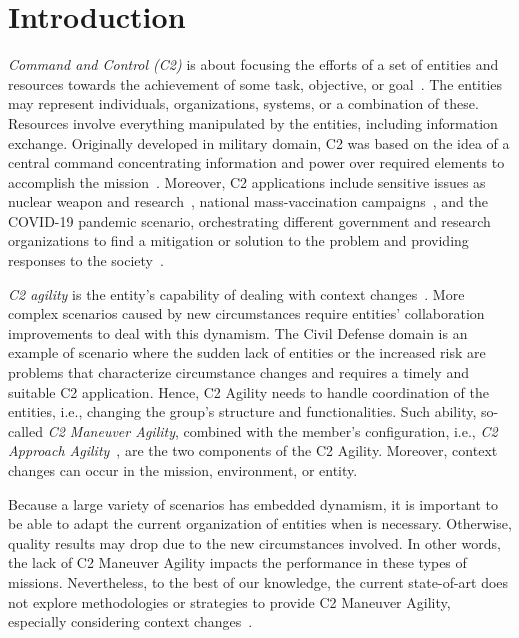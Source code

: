 \section{Introduction}
\label{sec:introduction}


\textit{Command and Control (C2)} is about focusing the efforts of a set of entities and resources towards the achievement of some task, objective, or goal~\citep{CC02}. The entities may represent individuals, organizations, systems, or a combination of these. Resources involve everything manipulated by the entities, including information exchange. Originally developed in military domain, C2 was based on the idea of a central command concentrating information and power over required elements to accomplish the mission~\citep{CC01}. Moreover, C2 applications include sensitive issues as nuclear weapon and research~\citep{C2-EX2}, national mass-vaccination campaigns~\citep{C2-EX1}, and the COVID-19 pandemic scenario, orchestrating different government and research organizations to find a mitigation or solution to the problem and providing responses to the society~\citep{C2-EX3, C2-EX4, C2-EX5}.


\textit{C2 agility} is the entity's capability of dealing with context changes~\citep{france2014}. More complex scenarios caused by new circumstances require entities' collaboration improvements to deal with this dynamism. The Civil Defense domain is an example of scenario where the sudden lack of entities or the increased risk are problems that characterize circumstance changes and requires a timely and suitable C2 application. Hence, C2 Agility needs to handle coordination of the entities, i.e., changing the group's structure and functionalities.  Such ability, so-called  \textit{C2 Maneuver Agility}, combined with the member's configuration, i.e., \textit{C2 Approach Agility}~\citep{alberts2006understanding}, are the two components of the C2 Agility. Moreover, context changes can occur in the mission, environment, or entity.


Because a large variety of scenarios has embedded dynamism, it is important to be able to adapt the current organization of entities when is necessary. Otherwise, quality results may drop due to the new circumstances involved. In other words, the lack of C2 Maneuver Agility impacts the performance in these types of missions. Nevertheless, to the best of our knowledge, the current state-of-art does not explore methodologies or strategies to provide C2 Maneuver Agility, especially considering context changes~\cite{france2014, futureC2}.

